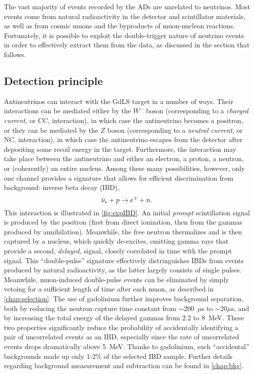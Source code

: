 \documentclass[../thesis.tex]{subfiles}
\begin{document}
The vast majority of events recorded by the ADs are unrelated to neutrinos. Most
events come from natural radioactivity in the detector and scintillator
materials, as well as from cosmic muons and the byproducts of muon-nucleon
reactions. Fortunately, it is possible to exploit the double-trigger nature of
neutrino events in order to effectively extract them from the data, as discussed
in the section that follows.

\subsection{Detection principle}
\label{sec:expDetPrinc}

Antineutrinos can interact with the GdLS target in a number of ways. Their
interactions can be mediated either by the $W^-$ boson (corresponding to a
\emph{charged current}, or CC, interaction), in which case the antineutrino
becomes a positron, or they can be mediated by the $Z$ boson (corresponding to a
\emph{neutral current}, or NC, interaction), in which case the antineutrino
escapes from the detector after depositing some recoil energy in the
target. Furthermore, the interaction may take place between the antineutrino and
either an electron, a proton, a neutron, or (coherently) an entire
nucleus. Among these many possibilities, however, only one channel provides a
signature that allows for efficient discrimination from background: inverse beta
decay (IBD),
\begin{equation*}
  \bar\nu_e + p \rightarrow e^+ + n.
\end{equation*}
This interaction is illustrated in \autoref{fig:expIBD}. An initial
\emph{prompt} scintillation signal is produced by the positron (first from
direct ionization, then from the gammas produced by annihilation). Meanwhile,
the free neutron thermalizes and is then captured by a nucleus, which quickly
de-excites, emitting gamma rays that provide a second, \emph{delayed,} signal,
closely correlated in time with the prompt signal. This ``double-pulse''
signature effectively distringuishes IBDs from events produced by natural
radioactivity, as the latter largely consists of single pulses. Meanwhile,
muon-induced double-pulse events can be eliminated by simply vetoing for a
sufficient length of time after each muon, as described in
\autoref{chap:selection}. The use of gadolinium further improves background
separation, both by reducing the neutron capture time constant from
$\sim$200~$\mu$s to $\sim$20$\mu$s, and by increasing the total energy of the
delayed gammas from 2.2 to 8~MeV. These two properties significantly reduce the
probability of accidentally identifying a pair of uncorrelated events as an IBD,
especially since the rate of uncorrelated events drops dramatically above
5~MeV. Thanks to gadolinium, such ``accidental'' backgrounds made up only 1-2\%
of the selected IBD sample. Further details regarding background measurement and
subtraction can be found in \autoref{chap:bkg}.
\end{document}
